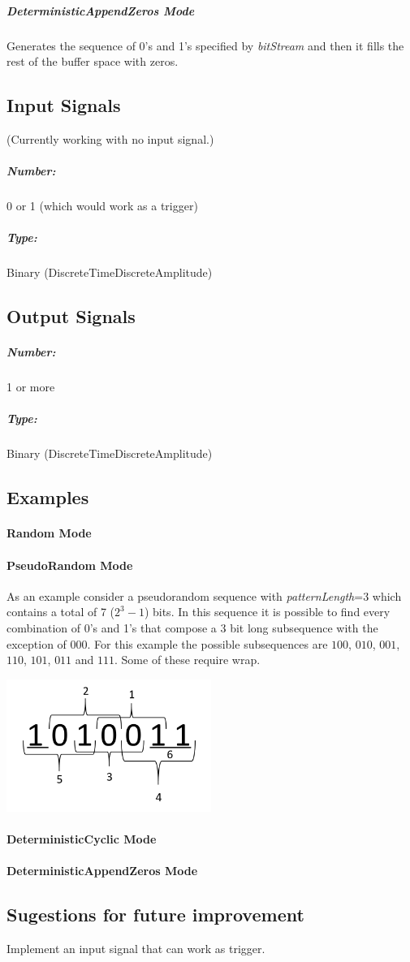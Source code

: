 \documentclass[a4paper]{article}
\begin{document}
\subparagraph*{DeterministicAppendZeros Mode}
Generates the sequence of 0's and 1's specified by \textit{bitStream} and then it fills the rest of the buffer space with zeros.

\subsection*{Input Signals}

(Currently working with no input signal.)

\subparagraph*{Number:} 0 or 1 (which would work as a trigger)

\subparagraph*{Type:} Binary (DiscreteTimeDiscreteAmplitude)

\subsection*{Output Signals}

\subparagraph*{Number:} 1 or more

\subparagraph*{Type:} Binary (DiscreteTimeDiscreteAmplitude)

\subsection*{Examples} 

\paragraph*{Random Mode}

\paragraph*{PseudoRandom Mode}
As an example consider a pseudorandom sequence with \textit{patternLength}=3 which contains a total of 7 ($2^3-1$) bits. In this sequence it is possible to find every combination of 0's and 1's that compose a 3 bit long subsequence with the exception of $000$. For this example the possible subsequences are $100$, $010$, $001$, $110$, $101$, $011$ and $111$. Some of these require wrap. 

\begin{center}
\includegraphics[width=0.5\textwidth]{BinarySequenceN3}
\end{center}

\paragraph*{DeterministicCyclic Mode}

\paragraph*{DeterministicAppendZeros Mode}

\subsection*{Sugestions for future improvement}

Implement an input signal that can work as trigger.
\end{document}
